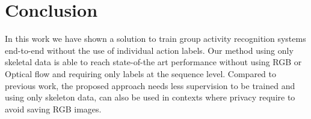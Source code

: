\documentclass[a4paper,conference]{IEEEtran}
\begin{document}
\section{Conclusion}
In this work we have shown a solution to train group activity recognition systems end-to-end without the use of individual action labels. Our method using only skeletal data is able to reach state-of-the art performance without using RGB or Optical flow and requiring only labels at the sequence level. Compared to previous work, the proposed approach needs less supervision to be trained and using only skeleton data, can also be used in contexts where privacy require to avoid saving RGB images.
























\end{document}
